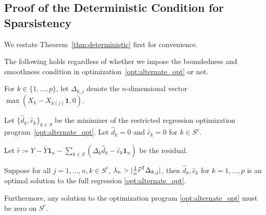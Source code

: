 

 
 
 
 \subsection{Proof of the Deterministic Condition for Sparsistency}
 \label{sec:deterministic_proof}
 
 We restate Theorem~\ref{thm:deterministic} first for convenience.
 
\begin{theorem} 
The following holds regardless of whether we impose the boundedness and smoothness condition in optimization~\ref{opt:alternate_opt} or not.

For $k \in \{1,...,p\}$, let $\Delta_{k, j}$ denote the $n$-dimensional vector $\max( X_k - X_{k (j)} \mathbf{1}, 0)$. 

Let $\{\hat{d}_k, \hat{c}_k \}_{k \in S}$ be the minimizer of the restricted regression optimization program~\ref{opt:alternate_opt}. 
Let $\hat{d}_k = 0$ and $ \hat{c}_k = 0$ for $k \in S^c$.

Let $\hat{r} \coloneqq Y - \bar{Y} \mathbf{1}_n - \sum_{k \in S} (\Delta_k \hat{d}_k - \hat{c}_k \mathbf{1}_n) $ be the residual.

Suppose for all $j=1,...,n, k\in S^c$, $\lambda_n > | \frac{1}{n} \widehat{r}^{\mathsf{T}} \Delta_{k,j}|$, then $\hat{d}_k, \hat{c}_k$ for $k=1,...,p$ is an optimal solution to the full regression \ref{opt:alternate_opt}.

Furthermore, any solution to the optimization program \ref{opt:alternate_opt} must be zero on $S^c$.
\end{theorem}

